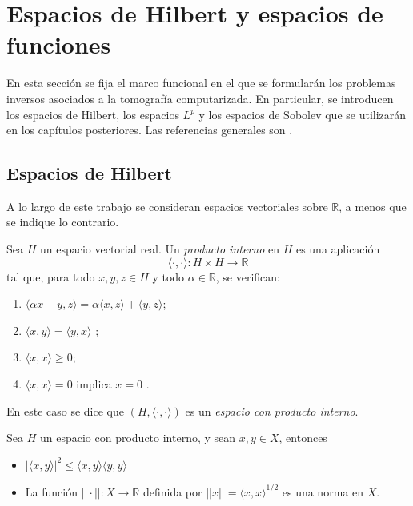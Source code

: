 \section{Espacios de Hilbert y espacios de funciones}
\label{Spaces}

En esta sección se fija el marco funcional en el que se formularán los problemas inversos asociados a la tomografía computarizada. En particular, se introducen los espacios de Hilbert, los espacios $L^{p}$ y los espacios de Sobolev que se utilizarán en los capítulos posteriores. Las referencias generales son \cite{rynne_youngson2000,kirsch2011,natterer2001,kuchment2014}.


\subsection{Espacios de Hilbert}

A lo largo de este trabajo se consideran espacios vectoriales sobre $\mathbb{R}$, a menos que se indique lo contrario.

\begin{definition}
Sea $H$ un espacio vectorial real. Un \emph{producto interno} en $H$ es una aplicación
\[
\langle \cdot,\cdot \rangle : H \times H \to \mathbb{R}
\]
tal que, para todo $x,y,z \in H$ y todo $\alpha \in \mathbb{R}$, se verifican:
\begin{enumerate}
  \item $\langle \alpha x + y, z \rangle = \alpha \langle x,z \rangle + \langle y,z \rangle$;
  \item $\langle x,y \rangle = \langle y,x \rangle$ ;
  \item $\langle x,x \rangle \ge 0$;
  \item $\langle x,x \rangle = 0$ implica $x=0$ .
\end{enumerate}
En este caso se dice que $(H,\langle \cdot,\cdot \rangle)$ es un \emph{espacio con producto interno}.
\end{definition}


\begin{proposition}

    Sea $H$ un espacio con producto interno, y sean $x, y \in X$, entonces
    \begin{itemize}
        \item $|\langle x,y \rangle|^2 \leq \langle x, y \rangle \langle y, y \rangle $
        \item La función $|| \cdot || : X \to \mathbb{R}$ definida por $|| x || = \langle x, x \rangle ^{1/2}$ es una norma en $X$.
    \end{itemize}
\end{proposition}


